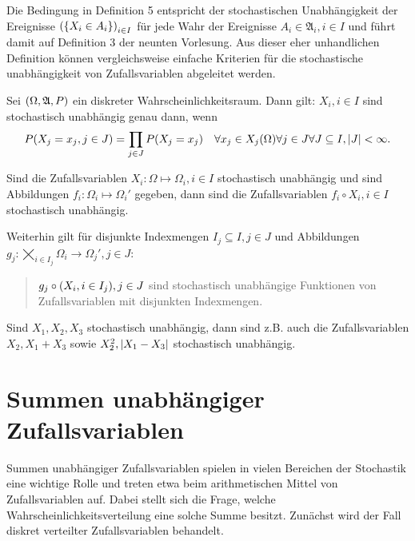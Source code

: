 \documentclass{lecture}
\begin{document}
    Die Bedingung in Definition 5 entspricht der stochastischen Unabhängigkeit der Ereignisse \(\parentheses*{\braces*{X_i \in A_i}}_{i \in I}\) für jede Wahr der Ereignisse \(A_i \in \mathfrak{A}_i, i \in I\) und führt damit auf Definition 3 der neunten Vorlesung.
    Aus dieser eher unhandlichen Definition können vergleichsweise einfache Kriterien für die stochastische unabhängigkeit von Zufallsvariablen abgeleitet werden.

    \begin{lemma}
        Sei \(\parentheses*{\Omega, \mathfrak{A}, P}\) ein diskreter Wahrscheinlichkeitsraum.
        Dann gilt: \(X_i, i \in I\) sind stochastisch unabhängig genau dann, wenn
        \[
            P\parentheses*{X_j = x_j, j \in J} = \prod_{j \in J}P\parentheses*{X_j = x_j} \quad \forall x_j \in X_j\parentheses*{\Omega} \forall j \in J \forall J \subseteq I, \absolute*{J} < \infty.
        \]
    \end{lemma}

    \begin{theorem}
        Sind die Zufallsvariablen \(X_i: \Omega \mapsto \Omega_i, i \in I\) stochastisch unabhängig und sind Abbildungen \(f_i: \Omega_i \mapsto \Omega_i'\) gegeben, dann sind die Zufallsvariablen \(f_i \circ X_i, i \in I\) stochastisch unabhängig.

        Weiterhin gilt für disjunkte Indexmengen \(I_j \subseteq I, j \in J\) und Abbildungen \(g_j: \bigtimes_{i \in I_j}\Omega_i \to \Omega_j', j \in J\):
        \begin{quote}
            \(g_j \circ \parentheses*{X_i, i \in I_j}, j \in J\) sind stochastisch unabhängige Funktionen von Zufallsvariablen mit disjunkten Indexmengen.
        \end{quote}
    \end{theorem}

    \begin{example}
        Sind \(X_1, X_2, X_3\) stochastisch unabhängig, dann sind z.B. auch die Zufallsvariablen \(X_2, X_1 + X_3\) sowie \(X_2^2, \absolute*{X_1 - X_3}\) stochastisch unabhängig.
    \end{example}


    \section*{Summen unabhängiger Zufallsvariablen}

    Summen unabhängiger Zufallsvariablen spielen in vielen Bereichen der Stochastik eine wichtige Rolle und treten etwa beim arithmetischen Mittel von Zufallsvariablen auf.
    Dabei stellt sich die Frage, welche Wahrscheinlichkeitsverteilung eine solche Summe besitzt.
    Zunächst wird der Fall diskret verteilter Zufallsvariablen behandelt.
\end{document}
